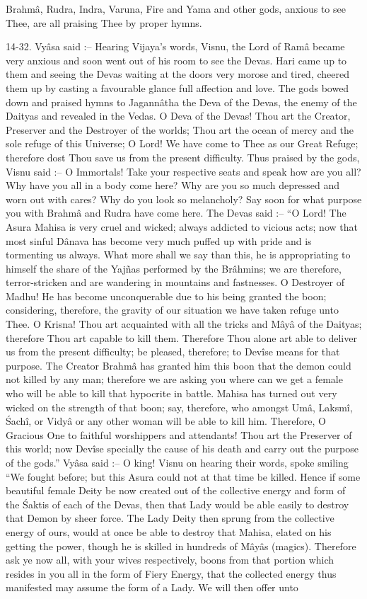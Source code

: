Brahm\^a, Rudra, Indra, Varuna, Fire and Yama and other gods, anxious to see Thee, are all praising Thee by proper hymns.

14-32. Vy\^asa said :-- Hearing Vijaya's words, Visnu, the Lord of Ram\^a became very anxious and soon went out of his room to see the Devas. Hari came up to them and seeing the Devas waiting at the doors very morose and tired, cheered them up by casting a favourable glance full affection and love. The gods bowed down and praised hymns to Jagann\^atha the Deva of the Devas, the enemy of the Daityas and revealed in the Vedas. O Deva of the Devas! Thou art the Creator, Preserver and the Destroyer of the worlds; Thou art the ocean of mercy and the sole refuge of this Universe; O Lord! We have come to Thee as our Great Refuge; therefore dost Thou save us from the present difficulty. Thus praised by the gods, Visnu said :-- O Immortals! Take your respective seats and speak how are you all? Why have you all in a body come here? Why are you so much depressed and worn out with cares? Why do you look so melancholy? Say soon for what purpose you with Brahm\^a and Rudra have come here. The Devas said :-- ``O Lord! The Asura Mahisa is very cruel and wicked; always addicted to vicious acts; now that most sinful D\^anava has become very much puffed up with pride and is tormenting us always. What more shall we say than this, he is appropriating to himself the share of the Yajñas performed by the Br\^ahmins; we are therefore, terror-stricken and are wandering in mountains and fastnesses. O Destroyer of Madhu! He has become unconquerable due to his being granted the boon; considering, therefore, the gravity of our situation we have taken refuge unto Thee. O Krisna! Thou art acquainted with all the tricks and M\^ay\^a of the Daityas; therefore Thou art capable to kill them. Therefore Thou alone art able to deliver us from the present difficulty; be pleased, therefore; to Dev\^ise means for that purpose. The Creator Brahm\^a has granted him this boon that the demon could not killed by any man; therefore we are asking you where can we get a female who will be able to kill that hypocrite in battle. Mahisa has turned out very wicked on the strength of that boon; say, therefore, who amongst Um\^a, Laksm\^i, \'Sach\^i, or Vidy\^a or any other woman will be able to kill him. Therefore, O Gracious One to faithful worshippers and attendants! Thou art the Preserver of this world; now Dev\^ise specially the cause of his death and carry out the purpose of the gods.'' Vy\^asa said :-- O king! Visnu on hearing their words, spoke smiling ``We fought before; but this Asura could not at that time be killed. Hence if some beautiful female Deity be now created out of the collective energy and form of the \'Saktis of each of the Devas, then that Lady would be able easily to destroy that Demon by sheer force. The Lady Deity then sprung from the collective energy of ours, would at once be able to destroy that Mahisa, elated on his getting the power, though he is skilled in hundreds of M\^ay\^as (magics). Therefore ask ye now all, with your wives respectively, boons from that portion which resides in you all in the form of Fiery Energy, that the collected energy thus manifested may assume the form of a Lady. We will then offer unto 